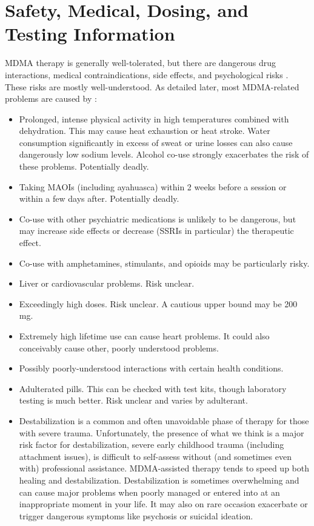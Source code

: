 \documentclass[12pt,letterpaper]{book}
\begin{document}
\section{Safety, Medical, Dosing, and Testing Information}
\label{sec:safety}
MDMA therapy is generally well-tolerated, but there are dangerous drug interactions, medical contraindications, side effects, and psychological risks \cite{wolfgang2025}. These risks are mostly well-understood. As detailed later, most MDMA-related problems are caused by \cite{wolfgang2025,riggDeaths,roxburghDeaths}:
\begin{itemize}
    \item Prolonged, intense physical activity in high temperatures combined with dehydration. This may cause heat exhaustion or heat stroke. Water consumption significantly in excess of sweat or urine losses can also cause dangerously low sodium levels. Alcohol co-use strongly exacerbates the risk of these problems. Potentially deadly.
    \item Taking MAOIs (including ayahuasca) within 2 weeks before a session or within a few days after. Potentially deadly.
    \item Co-use with other psychiatric medications is unlikely to be dangerous, but may increase side effects or decrease (SSRIs in particular) the therapeutic effect.
    \item Co-use with amphetamines, stimulants, and opioids may be particularly risky.
    \item Liver or cardiovascular problems. Risk unclear.
    \item Exceedingly high doses. Risk unclear. A cautious upper bound may be 200 mg.
    \item Extremely high lifetime use can cause heart problems. It could also conceivably cause other, poorly understood problems.
    \item Possibly poorly-understood interactions with certain health conditions.
    \item Adulterated pills. This can be checked with test kits, though laboratory testing is much better. Risk unclear and varies by adulterant.
    \item Destabilization is a common and often unavoidable phase of therapy for those with severe trauma. Unfortunately, the presence of what we think is a major risk factor for destabilization, severe early childhood trauma (including attachment issues), is difficult to self-assess without (and sometimes even with) professional assistance. MDMA-assisted therapy tends to speed up both healing and destabilization. Destabilization is sometimes overwhelming and can cause major problems when poorly managed or entered into at an inappropriate moment in your life. It may also on rare occasion exacerbate or trigger dangerous symptoms like psychosis or suicidal ideation.
\end{itemize}
\end{document}
